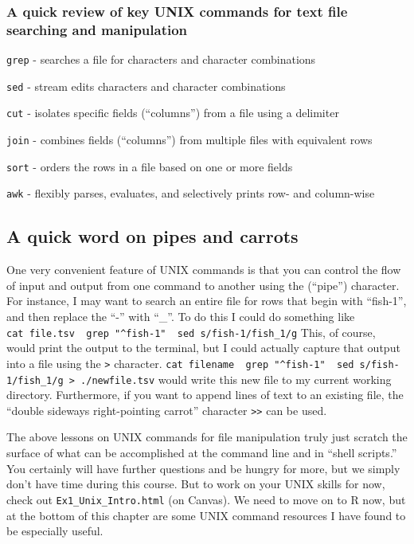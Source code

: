 \documentclass[
]{book}
\begin{document}
\hypertarget{a-quick-review-of-key-unix-commands-for-text-file-searching-and-manipulation}{%
\subsubsection{A quick review of key UNIX commands for text file searching and manipulation}\label{a-quick-review-of-key-unix-commands-for-text-file-searching-and-manipulation}}

\texttt{grep} - searches a file for characters and character combinations

\texttt{sed} - stream edits characters and character combinations

\texttt{cut} - isolates specific fields (``columns'') from a file using a delimiter

\texttt{join} - combines fields (``columns'') from multiple files with equivalent rows

\texttt{sort} - orders the rows in a file based on one or more fields

\texttt{awk} - flexibly parses, evaluates, and selectively prints row- and column-wise

\hypertarget{a-quick-word-on-pipes-and-carrots}{%
\subsection{A quick word on pipes and carrots}\label{a-quick-word-on-pipes-and-carrots}}

One very convenient feature of UNIX commands is that you can control the flow of input and output from one command to another using the \texttt{\textbar{}} (``pipe'') character. For instance, I may want to search an entire file for rows that begin with ``fish-1'', and then replace the ``-'' with ``\_''. To do this I could do something like \texttt{cat\ file.tsv\ \textbar{}\ grep\ "\^{}fish-1"\ \textbar{}\ sed\ \textquotesingle{}s/fish-1/fish\_1/g\textquotesingle{}} This, of course, would print the output to the terminal, but I could actually capture that output into a file using the \texttt{\textgreater{}} character. \texttt{cat\ filename\ \textbar{}\ grep\ "\^{}fish-1"\ \textbar{}\ sed\ \textquotesingle{}s/fish-1/fish\_1/g\textquotesingle{}\ \textgreater{}\ ./newfile.tsv} would write this new file to my current working directory. Furthermore, if you want to append lines of text to an existing file, the ``double sideways right-pointing carrot'' character \texttt{\textgreater{}\textgreater{}} can be used.

The above lessons on UNIX commands for file manipulation truly just scratch the surface of what can be accomplished at the command line and in ``shell scripts.'' You certainly will have further questions and be hungry for more, but we simply don't have time during this course. But to work on your UNIX skills for now, check out \texttt{Ex1\_Unix\_Intro.html} (on Canvas). We need to move on to R now, but at the bottom of this chapter are some UNIX command resources I have found to be especially useful.
\end{document}
